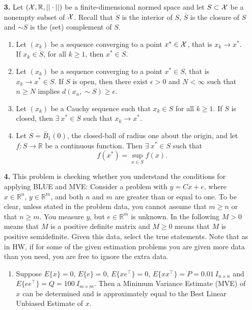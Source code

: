 \documentclass[letterpaper]{article}
\newcommand{\real}{\mathbb R}  %
\begin{document}
\begin{enumerate}
\newpage
\item[{\bf 3.}]  Let $({\cal X}, \real, ||\cdot||)$ be a finite-dimensional normed space and let $S \subset {\cal X}$ be a nonempty subset of ${\cal X}$. Recall that $\mathring{S}$ is the interior of $S$, $\bar{S}$ is the closure of $S$ and $\sim S$ is the (set) complement of $S$.
\begin{enumerate}
\setlength{\itemsep}{.15in}
\renewcommand{\labelenumi}{(\alph{enumi})}
\setlength{\itemsep}{.1in}
\item Let $(x_k)$ be a sequence converging to a point $x^*\in {\cal X}$, that is $x_k\to x^*$. If $x_k \in \mathring{S}$, for all $k\ge 1$, then $x^* \in {S}.$
\item Let $(x_k)$ be a sequence converging to a point $x^*\in S$, that is $x_k\to x^*\in S$. If $S$ is open, then there exist $\epsilon>0$ and $N< \infty$ such that $n\ge N$ implies $d(x_n,\sim S) \ge \epsilon$.
\item Let $(x_k)$ be a Cauchy sequence such that $x_k \in S$ for all $k\ge1$. If $S$ is closed, then $\exists~x^* \in {S}$ such that $ x_k\to x^*$.
\item  Let $S=\bar{B}_1(0)$, the closed-ball of radius one about the origin, and let $f:S\to \real$ be a continuous function. Then $\exists~x^*\in S$ such that
$$f(x^*) = \sup_{x\in S} f(x). $$
\end{enumerate}




\item[{\bf 4.}] This problem is checking whether you understand the conditions for applying BLUE and MVE: Consider a problem with $y=Cx+e$, where $x\in \real^n$, $y\in \real^m$, and both $n$ and $m$ are greater than or equal to one. To be clear, unless stated in the problem data, you cannot assume that $m \ge n$ or that $n \ge m$. You measure $y$, but $e\in \real^m$ is unknown. In the following $M >0$ means that $M$ is a positive definite matrix and $M\ge0$ means that $M$ is positive semidefinite. Given this data, select the true statements. Note that as in HW, if for some of the given estimation problems you are given more data than you need, you are free to ignore the extra data.
\begin{enumerate}
\setlength{\itemsep}{.15in}
\renewcommand{\labelenumi}{(\alph{enumi})}
\setlength{\itemsep}{.1in}




\item Suppose $E\{x\}=0$, $E\{e\}=0$, $E\{xe^\top\}=0$,  $E\{x x^\top\}=P =0.01 ~I_{n \times n}$  and $E\{e e^\top\}=Q=100~I_{m \times m}$. Then a Minimum Variance Estimate (MVE) of $x$ can be determined and is approximately equal to the Best Linear Unbiased Estimate of $x$.


\end{enumerate}
\end{enumerate}
\end{document}
